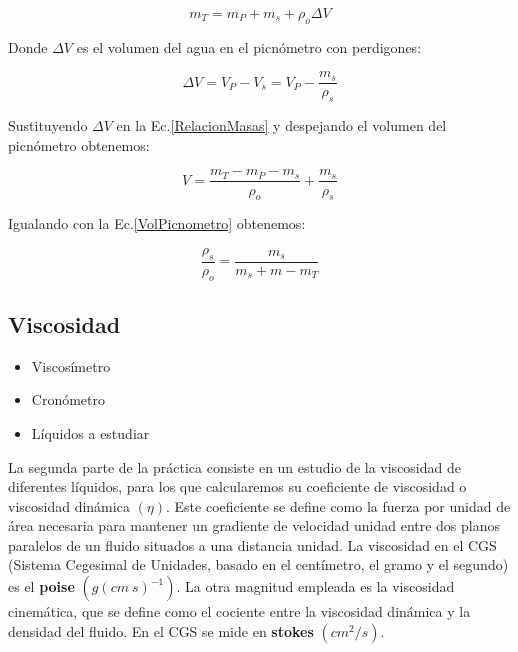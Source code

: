 \documentclass[a4paper,12pt,titlepage]{report}
\begin{document}
\begin{itemize}
        \begin{equation}
            m_{T}=m_{P}+m_{s}+\rho_{o} \Delta V
            \label{RelacionMasas}
        \end{equation}
    
    Donde $\Delta V$ es el volumen del agua en el picnómetro con perdigones:

        \begin{equation}
            \Delta V = V_{P}-V_{s}=V_{P}-\frac{m_{s}}{\rho_{s}}
        \end{equation}

    Sustituyendo $\Delta V$ en la Ec.\ref{RelacionMasas} y despejando el volumen del picnómetro obtenemos:

    \begin{equation}
        V = \frac{m_{T}-m_{P}-m_{s}}{\rho_{o}}+\frac{m_{s}}{\rho_{s}}
    \end{equation}

    Igualando con la Ec.\ref{VolPicnometro} obtenemos:

    \begin{equation}
        \frac{\rho_{s}}{\rho_{o}}=\frac{m_{s}}{m_{s}+m-m_{T}}
        \label{Densidad Sólido}
    \end{equation}

    
\end{itemize}



\subsection{Viscosidad}

\begin{itemize}
    \item Viscosímetro
    \item Cronómetro
    \item Líquidos a estudiar
\end{itemize}

La segunda parte de la práctica consiste en un estudio de la viscosidad de diferentes líquidos, para los que calcularemos su coeficiente de viscosidad o viscosidad dinámica $(\eta )$. Este coeficiente se define como la fuerza por unidad de área necesaria para mantener un gradiente de velocidad unidad entre dos planos paralelos de un fluido situados a una distancia unidad. La viscosidad en el CGS (Sistema Cegesimal de Unidades, basado en el centímetro, el gramo y el segundo) es el \textbf{poise} $(g(cm\: s)^{-1})$. La otra magnitud empleada es la viscosidad cinemática, que se define como el cociente entre la viscosidad dinámica y la densidad del fluido. En el CGS se mide en \textbf{stokes} $(cm^2/s)$.
\end{document}
